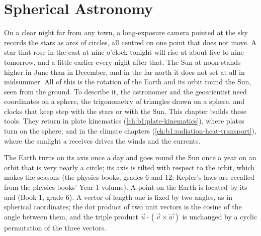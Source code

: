 \chapter{Spherical Astronomy}\label{ch:b1:spherical-astronomy}

On a clear night far from any town, a long-exposure camera pointed at the
sky records the stars as arcs of circles, all centred on one point that does
not move. A star that rose in the east at nine o'clock tonight will rise at
about five to nine tomorrow, and a little earlier every night after that. The
Sun at noon stands higher in June than in December, and in the far north it
does not set at all in midsummer. All of this is the rotation of the Earth
and its orbit round the Sun, seen from the ground. To describe it, the
astronomer and the geoscientist need coordinates on a sphere, the
trigonometry of triangles drawn on a sphere, and clocks that keep step with
the stars or with the Sun. This chapter builds these tools. They return in
plate kinematics (\cref{ch:b1:plate-kinematics}), where plates turn on the
sphere, and in the climate chapters (\cref{ch:b1:radiation-heat-transport}),
where the sunlight a  receives drives the winds and the currents.

\begin{recall}
The Earth turns on its axis once a day and goes round the Sun once a year on
an orbit that is very nearly a circle; its axis is tilted with respect to the
orbit, which makes the seasons (the physics books, grades 6 and 12; Kepler's
laws are recalled from the physics books' Year 1 volume). A point on the Earth
is located by its  and  (Book 1, grade 6). A vector of length
one is fixed by two angles, as in spherical coordinates; the dot product of
two unit vectors is the cosine of the angle between them, and the triple
product $\vec u\cdot(\vec v\times\vec w)$ is unchanged by a cyclic
permutation of the three vectors.
\end{recall}

